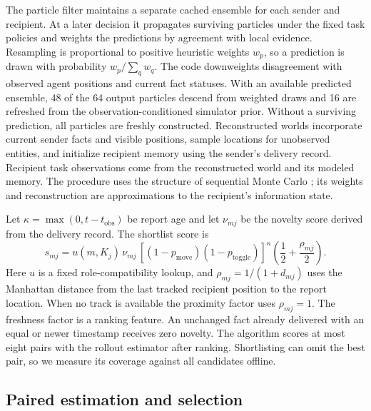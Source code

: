 \documentclass{article}
\begin{document}
The particle filter maintains a separate cached ensemble for each sender and recipient. At a later decision it propagates surviving particles under the fixed task policies and weights the predictions by agreement with local evidence. Resampling is proportional to positive heuristic weights $w_p$, so a prediction is drawn with probability $w_p/\sum_q w_q$. The code downweights disagreement with observed agent positions and current fact statuses. With an available predicted ensemble, 48 of the 64 output particles descend from weighted draws and 16 are refreshed from the observation-conditioned simulator prior. Without a surviving prediction, all particles are freshly constructed. Reconstructed worlds incorporate current sender facts and visible positions, sample locations for unobserved entities, and initialize recipient memory using the sender's delivery record. Recipient task observations come from the reconstructed world and its modeled memory. The procedure uses the structure of sequential Monte Carlo \cite{gordon1993}; its weights and reconstruction are approximations to the recipient's information state.

Let $\kappa=\max(0,t-t_{\mathrm{obs}})$ be report age and let $\nu_{mj}$ be the novelty score derived from the delivery record. The shortlist score is
\begin{equation}
 s_{mj}=u(m,K_j)\,\nu_{mj}\,
       [(1-p_{\mathrm{move}})(1-p_{\mathrm{toggle}})]^\kappa
       \left(\frac{1}{2}+\frac{\rho_{mj}}{2}\right).
 \label{eq:shortlist}
\end{equation}
Here $u$ is a fixed role-compatibility lookup, and $\rho_{mj}=1/(1+d_{mj})$ uses the Manhattan distance from the last tracked recipient position to the report location. When no track is available the proximity factor uses $\rho_{mj}=1$. The freshness factor is a ranking feature. An unchanged fact already delivered with an equal or newer timestamp receives zero novelty. The algorithm scores at most eight pairs with the rollout estimator after ranking. Shortlisting can omit the best pair, so we measure its coverage against all candidates offline.

\subsection{Paired estimation and selection}
\end{document}
